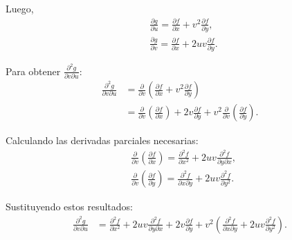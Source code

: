 \documentclass{report}
\begin{document}
    Luego,
    $$
    \begin{aligned}
    & \frac{\partial g}{\partial u} = \frac{\partial f}{\partial x} + v^2 \frac{\partial f}{\partial y}, \\
    & \frac{\partial g}{\partial v} = \frac{\partial f}{\partial x} + 2 u v \frac{\partial f}{\partial y}.
    \end{aligned}
    $$

    Para obtener \(\frac{\partial^2 g}{\partial v \partial u}\):
    $$
    \begin{aligned}
    \frac{\partial^2 g}{\partial v \partial u} &= \frac{\partial}{\partial v}\left( \frac{\partial f}{\partial x} + v^2 \frac{\partial f}{\partial y} \right) \\
    &= \frac{\partial}{\partial v}\left( \frac{\partial f}{\partial x} \right) + 2 v \frac{\partial f}{\partial y} + v^2 \frac{\partial}{\partial v}\left( \frac{\partial f}{\partial y} \right).
    \end{aligned}
    $$

    Calculando las derivadas parciales necesarias:
    $$
    \begin{aligned}
    & \frac{\partial}{\partial v}\left( \frac{\partial f}{\partial x} \right) = \frac{\partial^2 f}{\partial x^2} + 2 u v \frac{\partial^2 f}{\partial y \partial x}, \\
    & \frac{\partial}{\partial v}\left( \frac{\partial f}{\partial y} \right) = \frac{\partial^2 f}{\partial x \partial y} + 2 u v \frac{\partial^2 f}{\partial y^2}.
    \end{aligned}
    $$

    Sustituyendo estos resultados:
    $$
    \begin{aligned}
    \frac{\partial^2 g}{\partial v \partial u} &= \frac{\partial^2 f}{\partial x^2} + 2 u v \frac{\partial^2 f}{\partial y \partial x} + 2 v \frac{\partial f}{\partial y} + v^2 \left( \frac{\partial^2 f}{\partial x \partial y} + 2 u v \frac{\partial^2 f}{\partial y^2} \right).
    \end{aligned}
    $$
\end{document}
